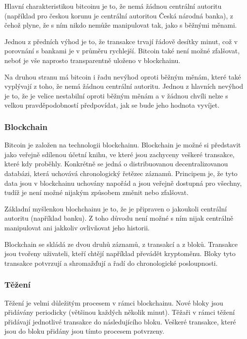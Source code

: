\documentclass[thesis=B,czech]{FITthesis}[2019/03/21]
\begin{document}
Hlavní charakteristikou bitcoinu je to, že nemá žádnou centrální autoritu (například pro českou korunu je centrální autoritou Česká národná banka), z čehož plyne, že s ním nikdo nemůže manipulovat tak, jako s běžnými měnami.

Jednou z předních výhod je to, že transakce trvají řádově desítky minut, což v porovnání s bankami je v průměru rychlejší. Bitcoin také není možné zfalšovat, neboť je vše naprosto transparentně uloženo v blockchainu.

Na druhou stranu má bitcoin i řadu nevýhod oproti běžným měnám, které také vyplývají z toho, že nemá žádnou centrální autoritu. Jednou z hlavních nevýhod je to, že je velice nestabilní oproti běžným měnám a v žádnou chvíli nelze s velkou pravděpodobností předpovídat, jak se bude jeho hodnota vyvíjet. \cite{Finex}

\subsubsection{Blockchain}
Bitcoin je založen na technologii blockchainu. Blockchain je možné si představit jako veřejně sdílenou účetní knihu, ve které jsou zachyceny veškeré transakce, které kdy proběhly. Konkrétně se jedná o distribuovanou decentralizovanou databázi, která uchovává chronologický řetězec záznamů. Principem je, že tyto data jsou v blockchainu uchovány napořád a jsou veřejně dostupná pro všechny, tudíž je není možné nijakým způsobem změnit nebo zfalšovat. \cite{Bitcoin_how_it_works}

Základní myšlenkou blochchainu je to, že je připraven o jakoukoli centrální autoritu (například banku). Z toho důvodu není možné s ním nijak centrálně manipulovat ani jakkoliv ovlivňovat jeho historii.

Blockchain se skládá ze dvou druhů záznamů, z transakcí a z bloků. Transakce jsou tvořeny uživateli, kteří chtějí například převádět kryptoměnu. Bloky tyto transakce potvrzují a shromažďují a řadí do chronologické posloupnosti. \cite{Finex_blockchain}

\subsubsection{Těžení}
Těžení je velmi důležitým procesem v rámci blockchainu. Nové bloky jsou přidávány periodicky (většinou každých několik minut). Těžaři v rámci těžení přidávají jednotlivé transakce do následujícího bloku. Veškeré transakce, které jsou do bloku přidány jsou tímto procesem potvrzeny. 
\end{document}
